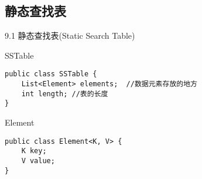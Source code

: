 \subsection{静态查找表}
\begin{frame}[fragile]{9.1 静态查找表(Static Search Table)}
\begin{easylist} \easyitem

\end{easylist}
\end{frame}


\begin{frame}[fragile]{SSTable}
\begin{lstlisting}[tabsize=8,keywordstyle=\color{red},basicstyle=\small]
public class SSTable {
	List<Element> elements;  //数据元素存放的地方
	int length; //表的长度
}
\end{lstlisting}

\end{frame}


\begin{frame}[fragile]{Element}
\begin{lstlisting}[tabsize=8,keywordstyle=\color{red},basicstyle=\small]
public class Element<K, V> {
	K key;
	V value;
}
\end{lstlisting}
\end{frame}




\begin{frame}[fragile]{}
\begin{easylist} \easyitem

\end{easylist}
\end{frame}


